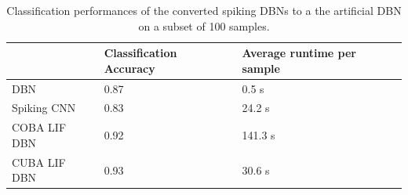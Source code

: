 \begin{table}[]
\centering
\caption{Classification performances of the converted spiking DBNs to a the artificial DBN on a subset of 100 samples.}
\label{tab:convperf}
\begin{tabular}{|l|l|l|}
\hline
	 				& Classification Accuracy    & Average runtime per sample \\ \hline
DBN     			& 0.87 & 0.5 s               \\
Spiking CNN     	& 0.83 & 24.2 s                \\
COBA LIF DBN     	& 0.92 & 141.3 s                \\
CUBA LIF DBN     	& 0.93 & 30.6 s                 \\\hline
\end{tabular}
\end{table}


